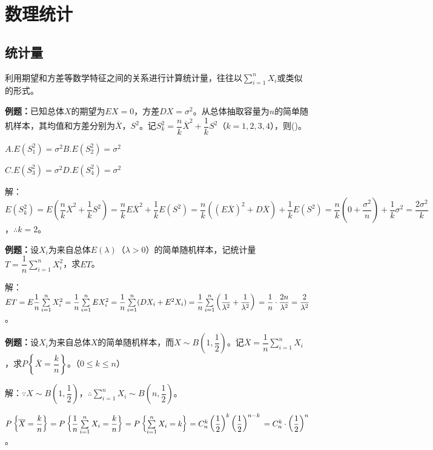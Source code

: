 \section{数理统计}
\subsection{统计量}

利用期望和方差等数学特征之间的关系进行计算统计量，往往以$\sum\limits_{i=1}^nX_i$或类似的形式。

\textbf{例题：}已知总体$X$的期望为$EX=0$，方差$DX=\sigma^2$。从总体抽取容量为$n$的简单随机样本，其均值和方差分别为$\overline{X}$，$S^2$。记$S_k^2=\dfrac{n}{k}\overline{X}^2+\dfrac{1}{k}S^2$（$k=1,2,3,4$），则()。

$A.E(S_1^2)=\sigma^2$\qquad$B.E(S_2^2)=\sigma^2$

$C.E(S_3^2)=\sigma^2$\qquad$D.E(S_4^2)=\sigma^2$

解：$E(S_k^2)=E\left(\dfrac{n}{k}\overline{X}^2+\dfrac{1}{k}S^2\right)=\dfrac{n}{k}E\overline{X}^2+\dfrac{1}{k}E(S^2)=\dfrac{n}{k}((E\overline{X})^2+D\overline{X})+\dfrac{1}{k}E(S^2)=\dfrac{n}{k}\left(0+\dfrac{\sigma^2}{n}\right)+\dfrac{1}{k}\sigma^2=\dfrac{2\sigma^2}{k}$，$\therefore k=2$。

\textbf{例题：}设$X_i$为来自总体$E(\lambda)$（$\lambda>0$）的简单随机样本，记统计量$T=\dfrac{1}{n}\sum\limits_{i=1}^nX_i^2$，求$ET$。

解：$ET=E\dfrac{1}{n}\sum\limits_{i=1}^nX_i^2=\dfrac{1}{n}\sum\limits_{i=1}^nEX_i^2=\dfrac{1}{n}\sum\limits_{i=1}^n(DX_i+E^2X_i)=\dfrac{1}{n}\sum\limits_{i=1}^n\left(\dfrac{1}{\lambda^2}+\dfrac{1}{\lambda^2}\right)\\=\dfrac{1}{n}\cdot\dfrac{2n}{\lambda^2}=\dfrac{2}{\lambda^2}$。

\textbf{例题：}设$X_i$为来自总体$X$的简单随机样本，而$X\sim B\left(1,\dfrac{1}{2}\right)$。记$\overline{X}=\dfrac{1}{n}\sum\limits_{i=1}^nX_i$，求$P\left\{\overline{X}=\dfrac{k}{n}\right\}$。（$0\leqslant k\leqslant n$）

解：$\because X\sim B\left(1,\dfrac{1}{2}\right)$，$\therefore\sum\limits_{i=1}^nX_i\sim B\left(n,\dfrac{1}{2}\right)$。

$P\left\{\overline{X}=\dfrac{k}{n}\right\}=P\left\{\dfrac{1}{n}\sum\limits_{i=1}^nX_i=\dfrac{k}{n}\right\}=P\left\{\sum\limits_{i=1}^nX_i=k\right\}=C_n^k\left(\dfrac{1}{2}\right)^k\left(\dfrac{1}{2}\right)^{n-k}\\=C_n^k\cdot\left(\dfrac{1}{2}\right)^n$。

